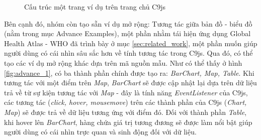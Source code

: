 \documentclass[12pt,a4paper]{article}
\begin{document}
\begin{figure}[!h]
	\begin{center}
    \caption{Cấu trúc một trang ví dụ trên trang chủ C9js}
    \label{fig:example_page_2}
	\end{center}
\end{figure}

Bên cạnh đó, nhóm còn tạo sẵn ví dụ mở rộng: Tương tác giữa bản đồ - biểu đồ (nằm trong mục Advance Examples), một phần nhằm tái hiện ứng dụng Global Health Atlas - WHO\cite{gha} đã trình bày ở mục \ref{sec:related_work}, một phần muốn giúp người dùng có cái nhìn sâu sắc hơn về tính tương tác trong C9js. Qua đó, có thể tạo các ví dụ mở rộng khác dựa trên mã nguồn mẫu. Như có thể thấy ở hình \ref{fig:advance_1}, có ba thành phần chính được tạo ra: \textit{BarChart, Map, Table}. Khi tương tác với một điểm trên \textit{Map}, \textit{BarChart} sẽ được cập nhật lại dựa trên dữ liệu trả về từ sự kiện tương tác với \textit{Map} - đây là tính năng \textit{EventListener} của C9js, các tương tác (\textit{click, hover, mousemove}) trên các thành phần của C9js (\textit{Chart, Map}) sẽ được trả về dữ liệu tương ứng với điểm đó. Đối với thành phần \textit{Table}, khi hover lên \textit{BarChart}, hàng chứa giá trị tương đương sẽ được làm nổi bật giúp người dùng có cái nhìn trực quan và sinh động đối với dữ liệu.
\end{document}
